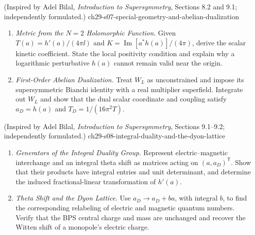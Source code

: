 \begin{enumerate}
    {(Inspired by Adel Bilal, \emph{Introduction to Supersymmetry}, Sections 8.2 and 9.1; independently formulated.)}
    {ch29-s07-special-geometry-and-abelian-dualization}
  \begin{enumerate}
    \item \emph{Metric from the \(N=2\) Holomorphic Function.}
    Given \(T(a)=h'(a)/(4\pi \ii)\) and
      \(K=\operatorname{Im}[a^*h(a)]/(4\pi)\), derive the scalar kinetic
      coefficient.  State the local positivity condition and explain why a
      logarithmic perturbative \(h(a)\) cannot remain valid near the origin.
    \item \emph{First-Order Abelian Dualization.}
    Treat \(W_L\) as unconstrained and impose its supersymmetric Bianchi
      identity with a real multiplier superfield.  Integrate out \(W_L\) and
      show that the dual scalar coordinate and coupling satisfy
      \(a_D=h(a)\) and \(T_D=1/(16\pi^2T)\).
  \end{enumerate}

    {(Inspired by Adel Bilal, \emph{Introduction to Supersymmetry}, Sections 9.1--9.2; independently formulated.)}
    {ch29-s08-integral-duality-and-the-dyon-lattice}
  \begin{enumerate}
    \item \emph{Generators of the Integral Duality Group.}
    Represent electric--magnetic interchange and an integral theta shift
      as matrices acting on \((a,a_D)^{\mathsf T}\).  Show that their
      products have integral entries and unit determinant, and determine the
      induced fractional-linear transformation of \(h'(a)\).
    \item \emph{Theta Shift and the Dyon Lattice.}
    Use \(a_D\to a_D+ba\), with integral \(b\), to find the corresponding
      relabeling of electric and magnetic quantum numbers.  Verify that the
      BPS central charge and mass are unchanged and recover the Witten shift
      of a monopole's electric charge.
  \end{enumerate}


\end{enumerate}
